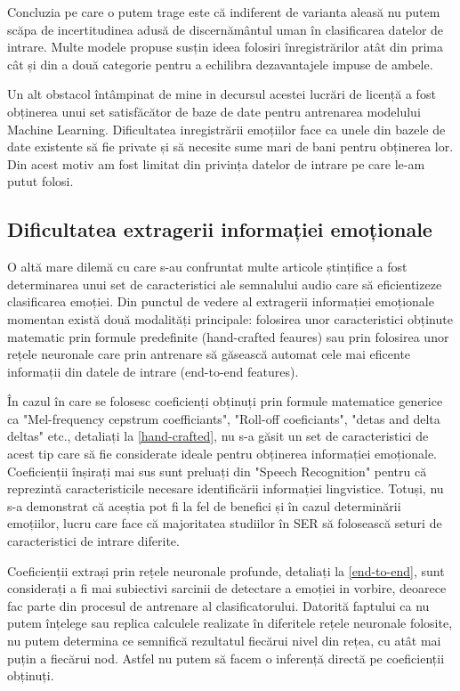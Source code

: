 \documentclass[a4paper,12pt]{book}
\begin{document}
					Concluzia pe care o putem trage este că indiferent de varianta aleasă nu putem scăpa de incertitudinea adusă de discernământul uman în clasificarea datelor de intrare. Multe modele propuse susțin ideea folosiri înregistrărilor atât din prima cât și din a două categorie pentru a echilibra dezavantajele impuse de ambele. \par
					Un alt obstacol întâmpinat de mine in decursul acestei lucrări de licență a fost obținerea unui set satisfăcător de baze de date pentru antrenarea modelului Machine Learning. Dificultatea inregistrării emoțiilor face ca unele din bazele de date existente să fie private și să necesite sume mari de bani pentru obținerea lor. Din acest motiv am fost limitat din privința datelor de intrare pe care le-am putut folosi.
				
				\subsection{Dificultatea extragerii informației emoționale} \label{dif_fex}
					O altă mare dilemă cu care s-au confruntat multe articole ștințifice a fost determinarea unui set de caracteristici ale semnalului audio care să eficientizeze clasificarea emoției. Din punctul de vedere al extragerii informației emoționale momentan există două modalități principale: folosirea unor caracteristici obținute matematic prin formule predefinite (hand-crafted feaures) sau prin folosirea unor rețele neuronale care prin antrenare să găsească automat cele mai eficente informații din datele de intrare (end-to-end features). \par
					În cazul în care se folosesc coeficienți obținuți prin formule matematice generice ca "Mel-frequency cepstrum coefficiants", "Roll-off coeficiants", "detas and delta deltas" etc., detaliați la \ref{hand-crafted}, nu s-a găsit un set de caracteristici de acest tip care să fie considerate ideale pentru obținerea informației emoționale. Coeficienții înșirați mai sus sunt preluați din "Speech Recognition" pentru că reprezintă caracteristicile necesare identificării informației lingvistice. Totuși, nu s-a demonstrat că aceștia pot fi la fel de benefici și în cazul determinării emoțiilor, lucru care face că majoritatea studiilor în SER să folosească seturi de caracteristici de intrare diferite. \par
					Coeficienții extrași prin rețele neuronale profunde, detaliați la \ref{end-to-end}, sunt considerați a fi mai subiectivi sarcinii de detectare a emoției in vorbire, deoarece fac parte din procesul de antrenare al clasificatorului. Datorită faptului ca nu putem înțelege sau replica calculele realizate în diferitele rețele neuronale folosite, nu putem determina ce semnifică rezultatul fiecărui nivel din rețea, cu atât mai puțin a fiecărui nod. Astfel nu putem să facem o inferență directă pe coeficienții obținuți. \par
					
\end{document}
